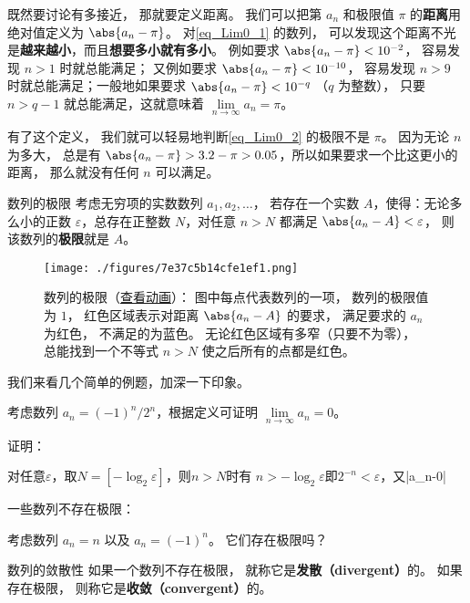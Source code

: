 既然要讨论有多接近， 那就要定义距离。 我们可以把第 $a_n$ 和极限值 $\pi$ 的\textbf{距离}用绝对值定义为 $\abs{a_n - \pi}$。 对\autoref{eq_Lim0_1} 的数列， 可以发现这个距离不光是\textbf{越来越小}，而且\textbf{想要多小就有多小}。 例如要求 $\abs{a_n - \pi} < 10^{-2}$， 容易发现 $n > 1$ 时就总能满足； 又例如要求 $\abs{a_n - \pi} < 10^{-10}$， 容易发现 $n > 9$ 时就总能满足；一般地如果要求 $\abs{a_n - \pi} < 10^{-q}$ （$q$ 为整数）， 只要 $n > q-1$ 就总能满足，这就意味着 $\lim\limits_{n \to \infty } a_n = \pi$。

有了这个定义， 我们就可以轻易地判断\autoref{eq_Lim0_2} 的极限不是 $\pi$。 因为无论 $n$ 为多大， 总是有 $\abs{a_n - \pi} > 3.2 - \pi > 0.05$，所以如果要求一个比这更小的距离， 那么就没有任何 $n$ 可以满足。

\begin{definition}{数列的极限}\label{def_Lim0_2}
考虑无穷项的实数数列 $a_1, a_2, \dots$， 若存在一个实数 $A$，使得：无论多么小的正数 $\varepsilon$，总存在正整数 $N$，对任意 $n > N$ 都满足 $\abs{a_n - A} < \varepsilon$， 则该数列的\textbf{极限}就是 $A$。
\end{definition}

\begin{figure}[ht]
\centering
\texttt{[image: ./figures/7e37c5b14cfe1ef1.png]}
\caption{数列的极限（\href{https://wuli.wiki/apps/Lim0.html}{查看动画}）： 图中每点代表数列的一项， 数列的极限值为 $1$， 红色区域表示对距离 $\abs{a_n - A}$ 的要求， 满足要求的 $a_n$ 为红色， 不满足的为蓝色。 无论红色区域有多窄（只要不为零）， 总能找到一个不等式 $n > N$ 使之后所有的点都是红色。} \label{fig_Lim0_1}
\end{figure}

我们来看几个简单的例题，加深一下印象。

\begin{example}{}
考虑数列 $a_n= {(-1)^n}/{2^n}$，根据定义可证明 $\lim\limits_{n\to\infty}a_n=0$。

证明：

对任意$\varepsilon$，取$N=[-\log_2\varepsilon]$，则$n>N$时有
$n>-\log_2\varepsilon$即$2^{-n}<\varepsilon$，又|a_n-0|
\end{example}

一些数列不存在极限：
\begin{exercise}{}\label{exe_Lim0_10}
考虑数列 $a_n = n$ 以及 $a_n=(-1)^n$。 它们存在极限吗？
\end{exercise}

\begin{definition}{数列的敛散性}\label{def_Lim0_4}
如果一个数列不存在极限， 就称它是\textbf{发散（divergent）}的。 如果存在极限， 则称它是\textbf{收敛（convergent）}的。
\end{definition}

